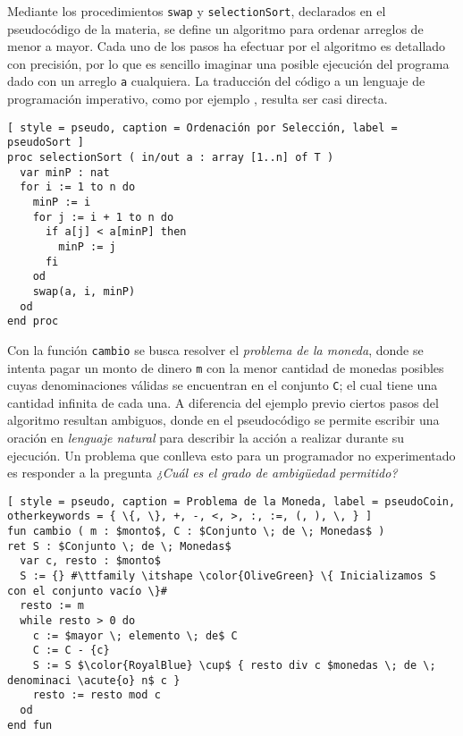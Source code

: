 Mediante los procedimientos \lstinline[style = pseudo]{swap} y \lstinline[style = pseudo]{selectionSort}, declarados en el pseudocódigo de la materia, se define un algoritmo para ordenar arreglos de menor a mayor.
Cada uno de los pasos ha efectuar por el algoritmo es detallado con precisión, por lo que es sencillo imaginar una posible ejecución del programa dado con un arreglo \lstinline[style = pseudo]{a} cualquiera.
La traducción del código a un lenguaje de programación imperativo, como por ejemplo \C{}, resulta ser casi directa.

\begin{lstlisting}[ style = pseudo, caption = Ordenación por Selección, label = pseudoSort ]
proc selectionSort ( in/out a : array [1..n] of T )
  var minP : nat
  for i := 1 to n do
    minP := i
    for j := i + 1 to n do
      if a[j] < a[minP] then
        minP := j
      fi
    od
    swap(a, i, minP)
  od
end proc
\end{lstlisting}

Con la función \lstinline[style = pseudo]{cambio} se busca resolver el \textit{problema de la moneda}, donde se intenta pagar un monto de dinero \lstinline[style = pseudo]{m} con la menor cantidad de monedas posibles cuyas denominaciones válidas se encuentran en el conjunto \lstinline[style = pseudo]{C}; el cual tiene una cantidad infinita de cada una.
A diferencia del ejemplo previo ciertos pasos del algoritmo resultan ambiguos, donde en el pseudocódigo se permite escribir una oración en \textit{lenguaje natural} para describir la acción a realizar durante su ejecución.
Un problema que conlleva esto para un programador no experimentado es responder a la pregunta \textit{¿Cuál es el grado de ambigüedad permitido?}

\begin{lstlisting}[ style = pseudo, caption = Problema de la Moneda, label = pseudoCoin, otherkeywords = { \{, \}, +, -, <, >, :, :=, (, ), \, } ]
fun cambio ( m : $monto$, C : $Conjunto \; de \; Monedas$ )
ret S : $Conjunto \; de \; Monedas$
  var c, resto : $monto$
  S := {} #\ttfamily \itshape \color{OliveGreen} \{ Inicializamos S con el conjunto vacío \}#
  resto := m
  while resto > 0 do
    c := $mayor \; elemento \; de$ C
    C := C - {c}
    S := S $\color{RoyalBlue} \cup$ { resto div c $monedas \; de \; denominaci \acute{o} n$ c }
    resto := resto mod c
  od
end fun
\end{lstlisting}

